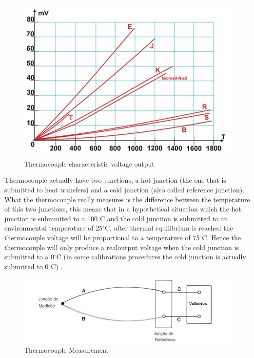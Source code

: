 	\begin{figure}[htbp]
		\centering
			\includegraphics[width=.8\textwidth]{figuras/fig-thermocouple-output.jpg}
		\caption{Thermocouple characteristic voltage output \cite{termo-curves}}
		\label{fig:thermocoupleVoltage}
	\end{figure}
		
	Thermocouple actually have two junctions, a hot junction (the one that is submitted to heat transfers) and a cold junction (also called reference junction). What the thermocouple really measures is the difference between the temperature of this two junctions, this means that in a hypothetical situation which the hot junction is submmited to a 100$^{\circ}$C and the cold junction is submitted to an environmental temperature of 25$^{\circ}$C, after thermal equilibrium is reached the thermocouple voltage will be proportional to a temperature of 75$^{\circ}$C. Hence the thermocouple will only produce a \"real\" output voltage when the cold junction is submitted to a 0$^{\circ}$C (in some calibrations procedures the cold junction is actually submitted to 0$^{\circ}$C) \cite{kinzie1973thermocouple}.
		
	\begin{figure}[htbp]
		\centering
			\includegraphics[width=.8\textwidth]{figuras/fig-thermocouple-measurement.jpg}
		\caption{Thermocouple Measurement \cite{termo-med}}
		\label{fig:thermocoupleMeasurement}
	\end{figure}
		

